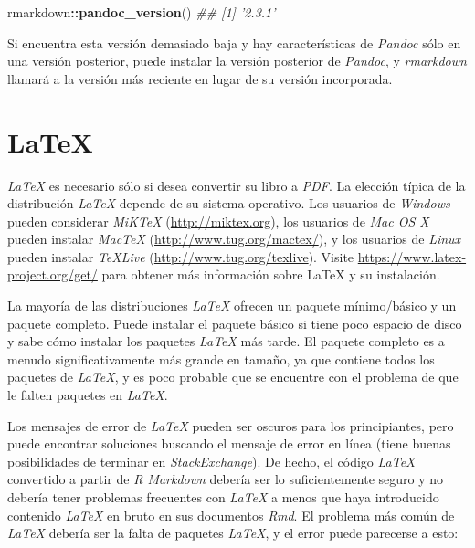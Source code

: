 \documentclass[12pt,]{krantz}
\makeatletter
\newenvironment{Shaded}{\begin{snugshade}}{\end{snugshade}}
\newcommand{\CommentTok}[1]{\textcolor[rgb]{0.56,0.35,0.01}{\textit{#1}}}
\newcommand{\KeywordTok}[1]{\textcolor[rgb]{0.13,0.29,0.53}{\textbf{#1}}}
\newcommand{\NormalTok}[1]{#1}
\newcommand{\OperatorTok}[1]{\textcolor[rgb]{0.81,0.36,0.00}{\textbf{#1}}}
\newenvironment{kframe}{%
\medskip{}
\setlength{\fboxsep}{.8em}
 \def\at@end@of@kframe{}%
 \ifinner\ifhmode%
  \def\at@end@of@kframe{\end{minipage}}%
  \begin{minipage}{\columnwidth}%
 \fi\fi%
 \def\FrameCommand##1{\hskip\@totalleftmargin \hskip-\fboxsep
 \colorbox{shadecolor}{##1}\hskip-\fboxsep
     \hskip-\linewidth \hskip-\@totalleftmargin \hskip\columnwidth}%
 \MakeFramed {\advance\hsize-\width
   \@totalleftmargin\z@ \linewidth\hsize
   \@setminipage}}%
 {\par\unskip\endMakeFramed%
 \at@end@of@kframe}
\renewenvironment{Shaded}{\begin{kframe}}{\end{kframe}}
\makeatother
\begin{document}
\begin{Shaded}
\begin{Highlighting}[]
\NormalTok{rmarkdown}\OperatorTok{::}\KeywordTok{pandoc_version}\NormalTok{()}
\CommentTok{## [1] '2.3.1'}
\end{Highlighting}
\end{Shaded}

Si encuentra esta versión demasiado baja y hay características de \emph{Pandoc} sólo en una versión posterior, puede instalar la versión posterior de \emph{Pandoc}, y \emph{rmarkdown} llamará a la versión más reciente en lugar de su versión incorporada.

\hypertarget{latex}{%
\section{LaTeX}\label{latex}}

\emph{LaTeX} es necesario sólo si desea convertir su libro a \emph{PDF}. La elección típica de la distribución \emph{LaTeX} depende de su sistema operativo. Los usuarios de \emph{Windows} pueden considerar \emph{MiKTeX} (\url{http://miktex.org}), los usuarios de \emph{Mac OS X} pueden instalar \emph{MacTeX} (\url{http://www.tug.org/mactex/}), y los usuarios de \emph{Linux} pueden instalar \emph{TeXLive} (\url{http://www.tug.org/texlive}). Visite \url{https://www.latex-project.org/get/} para obtener más información sobre LaTeX y su instalación.

La mayoría de las distribuciones \emph{LaTeX} ofrecen un paquete mínimo/básico y un paquete completo. Puede instalar el paquete básico si tiene poco espacio de disco y sabe cómo instalar los paquetes \emph{LaTeX} más tarde. El paquete completo es a menudo significativamente más grande en tamaño, ya que contiene todos los paquetes de \emph{LaTeX}, y es poco probable que se encuentre con el problema de que le falten paquetes en \emph{LaTeX}.

Los mensajes de error de \emph{LaTeX} pueden ser oscuros para los principiantes, pero puede encontrar soluciones buscando el mensaje de error en línea (tiene buenas posibilidades de terminar en \emph{StackExchange}). De hecho, el código \emph{LaTeX} convertido a partir de \emph{R Markdown} debería ser lo suficientemente seguro y no debería tener problemas frecuentes con \emph{LaTeX} a menos que haya introducido contenido \emph{LaTeX} en bruto en sus documentos \emph{Rmd}. El problema más común de \emph{LaTeX} debería ser la falta de paquetes \emph{LaTeX}, y el error puede parecerse a esto:
\end{document}
